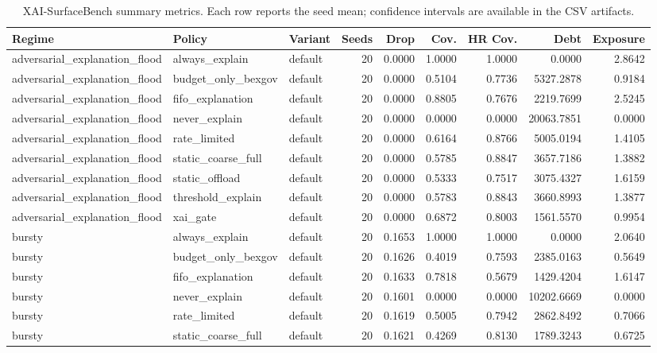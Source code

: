 \begin{table}[t]
\centering
\scriptsize
\caption{XAI-SurfaceBench summary metrics. Each row reports the seed mean; confidence intervals are available in the CSV artifacts.}
\begin{tabular}{lllrrrrrr}
\toprule
Regime & Policy & Variant & Seeds & Drop & Cov. & HR Cov. & Debt & Exposure \\
\midrule
adversarial\_explanation\_flood & always\_explain & default & 20 & 0.0000 & 1.0000 & 1.0000 & 0.0000 & 2.8642 \\
adversarial\_explanation\_flood & budget\_only\_bexgov & default & 20 & 0.0000 & 0.5104 & 0.7736 & 5327.2878 & 0.9184 \\
adversarial\_explanation\_flood & fifo\_explanation & default & 20 & 0.0000 & 0.8805 & 0.7676 & 2219.7699 & 2.5245 \\
adversarial\_explanation\_flood & never\_explain & default & 20 & 0.0000 & 0.0000 & 0.0000 & 20063.7851 & 0.0000 \\
adversarial\_explanation\_flood & rate\_limited & default & 20 & 0.0000 & 0.6164 & 0.8766 & 5005.0194 & 1.4105 \\
adversarial\_explanation\_flood & static\_coarse\_full & default & 20 & 0.0000 & 0.5785 & 0.8847 & 3657.7186 & 1.3882 \\
adversarial\_explanation\_flood & static\_offload & default & 20 & 0.0000 & 0.5333 & 0.7517 & 3075.4327 & 1.6159 \\
adversarial\_explanation\_flood & threshold\_explain & default & 20 & 0.0000 & 0.5783 & 0.8843 & 3660.8993 & 1.3877 \\
adversarial\_explanation\_flood & xai\_gate & default & 20 & 0.0000 & 0.6872 & 0.8003 & 1561.5570 & 0.9954 \\
bursty & always\_explain & default & 20 & 0.1653 & 1.0000 & 1.0000 & 0.0000 & 2.0640 \\
bursty & budget\_only\_bexgov & default & 20 & 0.1626 & 0.4019 & 0.7593 & 2385.0163 & 0.5649 \\
bursty & fifo\_explanation & default & 20 & 0.1633 & 0.7818 & 0.5679 & 1429.4204 & 1.6147 \\
bursty & never\_explain & default & 20 & 0.1601 & 0.0000 & 0.0000 & 10202.6669 & 0.0000 \\
bursty & rate\_limited & default & 20 & 0.1619 & 0.5005 & 0.7942 & 2862.8492 & 0.7066 \\
bursty & static\_coarse\_full & default & 20 & 0.1621 & 0.4269 & 0.8130 & 1789.3243 & 0.6725 \\

\end{tabular}
\end{table}
